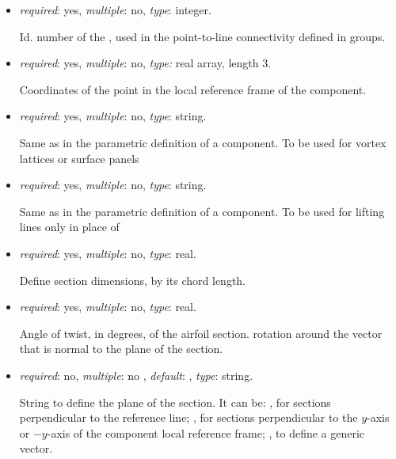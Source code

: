 \begin{itemize}

\item {} \textit{required}: yes, \textit{multiple}: no, \textit{type}: integer.

    Id. number of the , used in the point-to-line 
    connectivity defined in  groups.

\item {}  \textit{required}: yes, \textit{multiple}: 
      no, \textit{type:} real array, length 3.

    Coordinates of the point in the local reference frame of the component.
    
\item {}  \textit{required}: yes, \textit{multiple}: no, \textit{type}: string.

    Same as in the parametric definition of a component. To be used for vortex 
    lattices or surface panels
    
\item {}  \textit{required}: yes, \textit{multiple}: no, 
    \textit{type}: string.

    Same as in the parametric definition of a component. 
    To be used for lifting lines only in place of 

\item {}  \textit{required}: yes, \textit{multiple}: no, \textit{type}: real.

    Define section dimensions, by its chord length.

\item {}  \textit{required}: yes, \textit{multiple}: no, \textit{type}: real.

    Angle of twist, in degrees, of the airfoil section. rotation around 
    the vector that is normal to the plane of the section.

\item {} \textit{required}: no, \textit{multiple}: no , 
\textit{default}:  , \textit{type}: string.

    String to define the plane of the section. It can be: , 
    for sections perpendicular to the reference line; , 
     for sections perpendicular to the $y$-axis or 
    $-y$-axis of the component local reference frame; , 
    to define a generic vector. 


\end{itemize}

